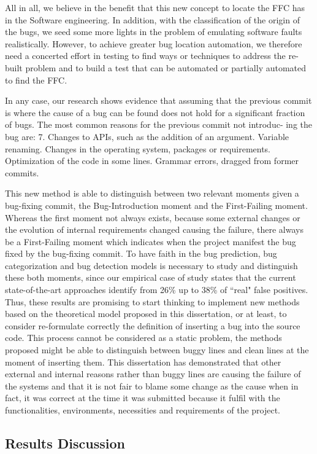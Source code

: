\documentclass[a4paper, 12pt]{book}
\begin{document}
All in all, we believe in the benefit that this new concept to locate the FFC has in the Software engineering. In addition, with the classification of the origin of the bugs, we seed some more lights in the problem of emulating software faults realistically. However, to achieve greater bug location automation, we therefore need a concerted effort in testing to find ways or techniques to address the re-built problem and to build a test that can be automated or partially automated to find the FFC.

In any case, our research shows evidence that assuming that the previous commit is where the cause of a bug can be found does not hold for a significant fraction of bugs. The most common reasons for the previous commit not introduc- ing the bug are:
7. Changes to APIs, such as the addition of an argument. Variable renaming.
    Changes in the operating system, packages or requirements.
    Optimization of the code in some lines. Grammar errors, dragged from former commits.
    
    This new method is able to distinguish between two relevant moments given a bug-fixing commit, the Bug-Introduction moment and the First-Failing moment. Whereas the first moment not always exists, because some external changes or the evolution of internal requirements changed causing the failure, there always be a First-Failing moment which indicates when the project manifest the bug fixed by the bug-fixing commit. To have faith in the bug prediction, bug categorization and bug detection models is necessary to study and distinguish these both moments, since our empirical case of study states that the current state-of-the-art approaches identify from 26\% up to 38\% of ``real" false positives. Thus, these results are promising to start thinking to implement new methods based on the theoretical model proposed in this dissertation, or at least, to consider re-formulate correctly the definition of inserting a bug into the source code. This process cannot be considered as a static problem, the methods proposed might be able to distinguish between buggy lines and clean lines at the moment of inserting them. This dissertation has demonstrated that other external and internal reasons rather than buggy lines are causing the failure of the systems and that it is not fair to blame some change as the cause when in fact, it was correct at the time it was submitted because it fulfil with the functionalities, environments, necessities and requirements of the project.


\subsection{Results Discussion}
\end{document}
